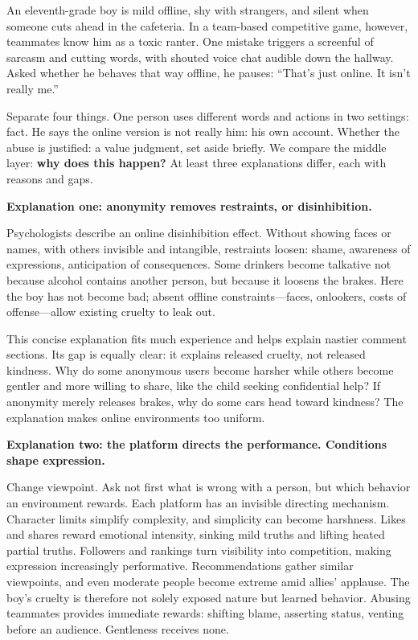 An eleventh-grade boy is mild offline, shy with strangers, and silent when someone cuts ahead in the cafeteria. In a team-based competitive game, however, teammates know him as a toxic ranter. One mistake triggers a screenful of sarcasm and cutting words, with shouted voice chat audible down the hallway. Asked whether he behaves that way offline, he pauses: ``That's just online. It isn't really me.''

Separate four things. One person uses different words and actions in two settings: fact. He says the online version is not really him: his own account. Whether the abuse is justified: a value judgment, set aside briefly. We compare the middle layer: \textbf{why does this happen?} At least three explanations differ, each with reasons and gaps.

\textbf{Explanation one: anonymity removes restraints, or disinhibition.}

Psychologists describe an online disinhibition effect. Without showing faces or names, with others invisible and intangible, restraints loosen: shame, awareness of expressions, anticipation of consequences. Some drinkers become talkative not because alcohol contains another person, but because it loosens the brakes. Here the boy has not become bad; absent offline constraints---faces, onlookers, costs of offense---allow existing cruelty to leak out.

This concise explanation fits much experience and helps explain nastier comment sections. Its gap is equally clear: it explains released cruelty, not released kindness. Why do some anonymous users become harsher while others become gentler and more willing to share, like the child seeking confidential help? If anonymity merely releases brakes, why do some cars head toward kindness? The explanation makes online environments too uniform.

\textbf{Explanation two: the platform directs the performance. Conditions shape expression.}

Change viewpoint. Ask not first what is wrong with a person, but which behavior an environment rewards. Each platform has an invisible directing mechanism. Character limits simplify complexity, and simplicity can become harshness. Likes and shares reward emotional intensity, sinking mild truths and lifting heated partial truths. Followers and rankings turn visibility into competition, making expression increasingly performative. Recommendations gather similar viewpoints, and even moderate people become extreme amid allies' applause. The boy's cruelty is therefore not solely exposed nature but learned behavior. Abusing teammates provides immediate rewards: shifting blame, asserting status, venting before an audience. Gentleness receives none.

